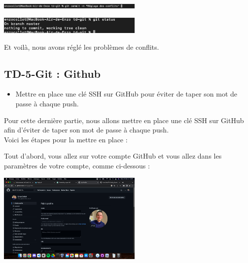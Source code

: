 \documentclass[12pt]{article}
\begin{document}
\vspace{0.3cm}

\begin{center}
  \includegraphics[width=7cm]{Image-TD-Git-4/git-commit-conflits.png}
\end{center}

\vspace{0.3cm}

\begin{center}
  \includegraphics[width=7cm]{Image-TD-Git-4/git-status.png}
\end{center}

\vspace{0.3cm}

Et voilà, nous avons réglé les problèmes de conflits.

\newpage

\subsection{TD-5-Git : Github}

\vspace{0.3cm}

\begin{itemize}
  \item Mettre en place une clé SSH sur GitHub pour éviter de taper son mot de passe à chaque push.
\end{itemize}

\vspace{0.3cm}

Pour cette dernière partie, nous allons mettre en place une clé SSH sur GitHub afin d'éviter de taper son mot de passe à chaque push. \\

Voici les étapes pour la mettre en place :

\vspace{0.3cm}

Tout d'abord, vous allez sur votre compte GitHub et vous allez dans les paramètres de votre compte, comme ci-dessous :

\vspace{0.3cm}

\begin{center}
  \includegraphics[width=7cm]{Image-TD-Git-5/setting-github.png}
\end{center}
\end{document}
